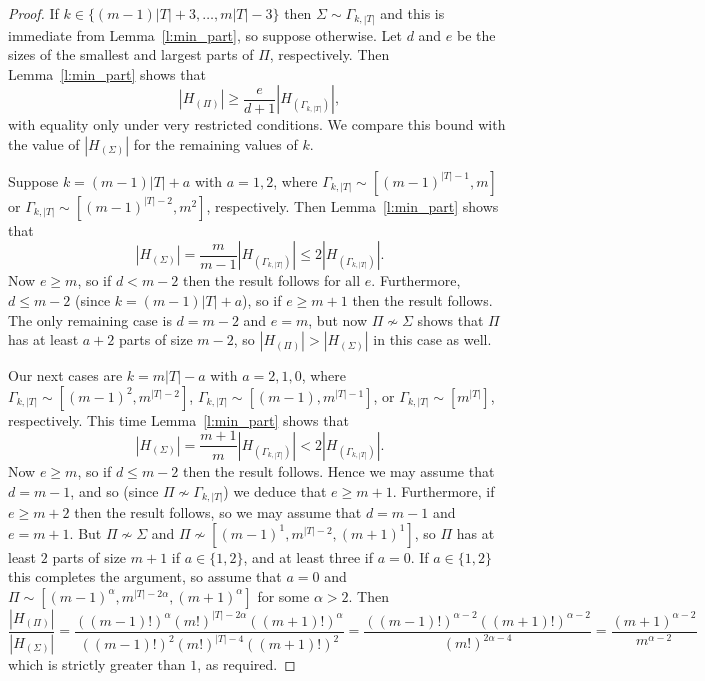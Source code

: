 \documentclass[twoside,a4paper,reqno,11pt]{amsart}
\newcommand{\<}{\langle}
\renewcommand{\>}{\rangle}
\newcommand{\leqs}{\leqslant}
\newcommand{\geqs}{\geqslant}
\def\ge{\geqs}
\def\le{\leqs}
\newcommand{\minPart}{\Gamma_{k, |T|}}
\theoremstyle{definition}
\begin{document}
\begin{proof}
	If $k \in \{(m-1)|T| + 3, \ldots, m|T|-3\}$ then $\Sigma\sim\Gamma_{k, |T|}$ and this is immediate from Lemma~\ref{l:min_part}, so suppose otherwise. Let $d$ and $e$ be the sizes of the smallest and largest parts of $\Pi$, respectively. Then Lemma~\ref{l:min_part} shows that $$|H_{(\Pi)}| \geqs \frac{e}{d+1}|H_{(\minPart)}|,$$ with equality only under very restricted conditions.  We compare this bound with the value of $|H_{(\Sigma)}|$ for the remaining values of $k$.

    Suppose $k = (m-1)|T| + a$ with $a = 1, 2$, where $\minPart \sim [(m-1)^{|T|-1}, m]$ or $\minPart \sim [(m-1)^{|T|-2}, m^2]$, respectively.
    Then Lemma~\ref{l:min_part} shows that
    $$|H_{(\Sigma)}| = \frac{m}{m-1}|H_{(\minPart)}| \leqs 2|H_{(\minPart)}|.$$
    Now $e \geqs m$, so if $d < m-2$ then the result follows for all $e$. Furthermore, $d \leqs m-2$ (since $k = (m-1)|T|+a$), so if $e \geqs m+1$ then the result follows. The only remaining case is $d = m-2$ and $e = m$, but now $\Pi \not\sim\Sigma$ shows that $\Pi$ has at least $a + 2$ parts of size $m-2$, so $|H_{(\Pi)}| > |H_{(\Sigma)}|$ in this case as well. 

    Our next cases are  $k = m|T|-a$ with $a = 2, 1, 0$, where $\minPart \sim [(m-1)^2, m^{|T|-2}]$, $ \minPart \sim [(m-1), m^{|T|-1}]$, or $\minPart \sim [m^{|T|}]$, respectively. This time Lemma~\ref{l:min_part} shows that  $$|H_{(\Sigma)}| = \frac{m+1}{m}|H_{(\minPart)}|  <  2|H_{(\minPart)}|. $$ %
    Now $e \geqs m$, so if $d \leqs  m-2$ then the result follows. Hence we may assume that $d = m-1$, and so (since $\Pi \not\sim \minPart$) we deduce that $e \geqs m+1$. Furthermore, if $e \geqs m+2$ then the result follows, so we may assume that $d =  m-1$ and $e = m+1$. But $\Pi \not\sim \Sigma$ and $\Pi \not\sim [(m-1)^1, m^{|T|-2}, (m+1)^{1}]$, so $\Pi$ has at least $2$ parts of size $m+1$ if $a \in \{1, 2\}$, and at least three if $a = 0$. If $a \in \{1, 2\}$ this completes the argument, so assume that $a = 0$ and $\Pi \sim [(m-1)^\alpha, m^{|T|-2\alpha},(m+1)^{\alpha}]$ for some $\alpha > 2$. Then 
    \[\frac{|H_{(\Pi)}|}{|H_{(\Sigma)}|} = \frac{((m-1)!)^{\alpha} (m!)^{|T|-2\alpha}((m+1)!)^{\alpha}}
    {((m-1)!)^{2} (m!)^{|T|-4}((m+1)!)^{2}} = \frac{((m-1)!)^{\alpha-2} ((m+1)!)^{\alpha-2}}{(m!)^{2\alpha-4}} 
    = \frac{(m+1)^{\alpha - 2}
    }{m^{\alpha-2}}\] which is strictly greater than $1$, as required.
    \end{proof}
\end{document}
